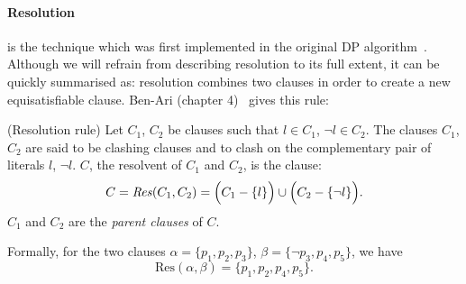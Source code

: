 \paragraph{Resolution} is the technique which was first implemented in the original DP algorithm~\cite{Original-DP-Article}. Although we will refrain from describing resolution to its full extent, it can be quickly summarised as: resolution combines two clauses in order to create a new equisatisfiable clause. Ben-Ari (chapter 4)~\cite{Math-Logic-for-CompSci} gives this rule:
\begin{definition}
    (Resolution rule) Let \(C_1\), \(C_2\) be clauses such that \(l \in C_1\), \(\neg l \in C_2\). The clauses \(C_1\), \(C_2\) are said to be clashing clauses and to clash on the complementary pair of literals \(l\), \(\neg l\). \(C\), the resolvent of \(C_1\) and \(C_2\), is the clause:
    \begin{equation*}
        C = \text{\emph{Res}}(C_1, C_2) = \Big(
            C_1 - \{l\}
        \Big) \cup \Big(
            C_2 - \{\neg l\}
        \Big).
    \end{equation*}
    \(C_1\) and \(C_2\) are the \emph{parent clauses} of \(C\).
\end{definition}
Formally, for the two clauses \(\alpha = \{p_1, p_2, p_3\}\), \(\beta = \{\neg p_3, p_4, p_5\}\), we have
\begin{equation*}
    \text{Res}(\alpha, \beta) = \{p_1, p_2, p_4, p_5\}.
\end{equation*}


